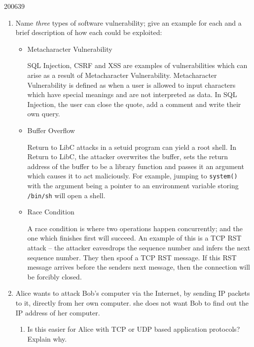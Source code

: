 \documentclass[10pt,\jkfside,a4paper]{article}
\begin{document}
\begin{examquestion}{2006}{3}{9}

\begin{enumerate}[label=(\alph*)]

\item Name \textit{three} types of software vulnerability; give an example
for each and a brief description of how each could be exploited:

\begin{itemize}

\item Metacharacter Vulnerability

SQL Injection, CSRF and XSS are examples of vulnerabilities which can arise
as a result of Metacharacter Vulnerability. Metacharacter Vulnerability is
defined as when a user is allowed to input characters which have special
meanings and are not interpreted as data. In SQL Injection, the user can
close the quote, add a comment and write their own query.

\item Buffer Overflow

Return to LibC attacks in a setuid program can yield a root shell. In Return
to LibC, the attacker overwrites the buffer, sets the return address of the
buffer to be a library function and passes it an argument which causes it to
act maliciously. For example, jumping to \texttt{system()} with the argument
being a pointer to an environment variable storing \texttt{/bin/sh} will
open a shell.

\item Race Condition

A race condition is where two operations happen concurrently; and the one
which finishes first will succeed. An example of this is a TCP RST attack --
the attacker eavesdrops the sequence number and infers the next
sequence number. They then spoof a TCP RST message. If this RST message
arrives before the senders next message, then the connection will be
forcibly closed.

\end{itemize}

\item Alice wants to attack Bob's computer via the Internet, by sending IP
packets to it, directly from her own computer. she does not want Bob to find
out the IP address of her computer.

\begin{enumerate}

\item Is this easier for Alice with TCP or UDP based application protocols?
Explain why.


\end{enumerate}
\end{enumerate}
\end{examquestion}
\end{document}
